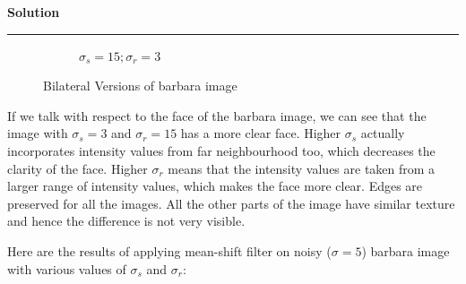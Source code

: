\documentclass[a4paper,12pt]{article}
\newenvironment{solution}[2][]{%
    \begin{mdframed}[linecolor=green!60!black, linewidth=2pt, roundcorner=10pt, backgroundcolor=green!5!white, skipabove=12pt, skipbelow=12pt]%
        \textbf{\large #2} %
        \par\noindent\rule{\textwidth}{0.4pt} %
        \vspace{0.5em} %
}{%
    \end{mdframed}%
}
\begin{document}
\begin{solution}{Solution}
\begin{figure}[H]
\begin{subfigure}[b]{0.24\textwidth}
        \caption{$\sigma_s=15;\sigma_r=3$}
        \label{fig:subfig3}
    \end{subfigure}
    
    \caption{Bilateral Versions of barbara image }
    \label{fig:overall}
\end{figure}

If we talk with respect to the face of the barbara image, we can see that the image with $\sigma_s = 3$ and $\sigma_r = 15$ has a more clear face. Higher $\sigma_s$ actually incorporates intensity values from far neighbourhood too, which decreases the clarity of the face. Higher $\sigma_r$ means that the intensity values are taken from a larger range of intensity values, which makes the face more clear. Edges are preserved for all the images. All the other parts of the image have similar texture and hence the difference is not very visible.


Here are the results of applying mean-shift filter on noisy ($\sigma = 5$) barbara image with various values of $\sigma_s$ and $\sigma_r$:


\end{solution}
\end{document}
